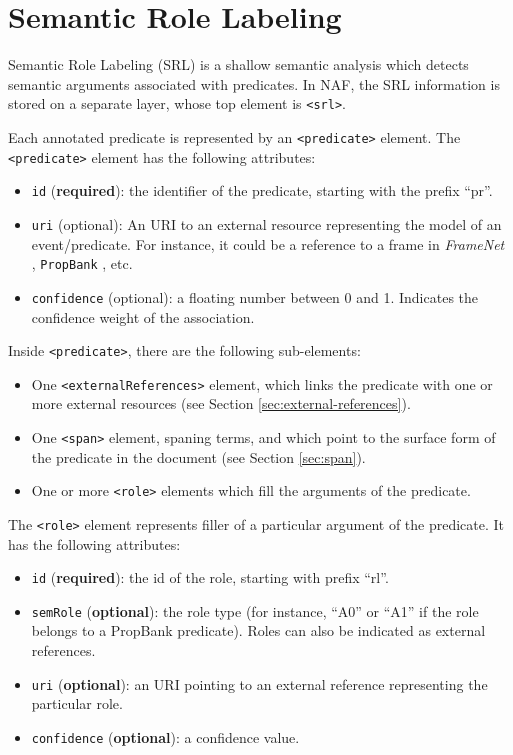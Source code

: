 
\section{Semantic Role Labeling}
\label{sec:semant-role-label}

Semantic Role Labeling (SRL) is a shallow semantic analysis which detects
semantic arguments associated with predicates. In NAF, the SRL information
is stored on a separate layer, whose top element is \texttt{<srl>}.

Each annotated predicate is represented by an \texttt{<predicate>}
element. The \texttt{<predicate>} element has the following attributes:
\begin{itemize}
\item \texttt{id} (\textbf{required}): the identifier of the predicate,
  starting with the prefix ``pr''.
\item \texttt{uri} (optional): An URI to an external resource representing the model of
  an event/predicate. For instance, it could be a reference to a frame in
  \emph{FrameNet} \cite{Baker+'98}, \texttt{PropBank} \cite{propbank02}, etc.
\item \texttt{confidence} (optional): a floating number between 0 and
  1. Indicates the confidence weight of the association.
\end{itemize}


Inside \texttt{<predicate>}, there are the following sub-elements:
\begin{itemize}
\item One \texttt{<externalReferences>} element, which links the predicate
  with one or more external resources (see Section
  \ref{sec:external-references}).
\item One \texttt{<span>} element, spaning terms, and which point to the
  surface form of the predicate in the document (see Section
  \ref{sec:span}).
\item One or more \texttt{<role>} elements which fill the arguments of the
  predicate.
\end{itemize}

The \texttt{<role>} element represents filler of a particular argument of
the predicate. It has the following attributes:
\begin{itemize}
\item \texttt{id} (\textbf{required}): the id of the role, starting with
  prefix ``rl''.
\item \texttt{semRole} (\textbf{optional}): the role type (for instance,
  ``A0'' or ``A1'' if the role belongs to a PropBank predicate). Roles can also be indicated as external references.
\item \texttt{uri} (\textbf{optional}): an URI pointing to an external
  reference representing the particular role.
\item \texttt{confidence} (\textbf{optional}): a confidence value.
\end{itemize}

